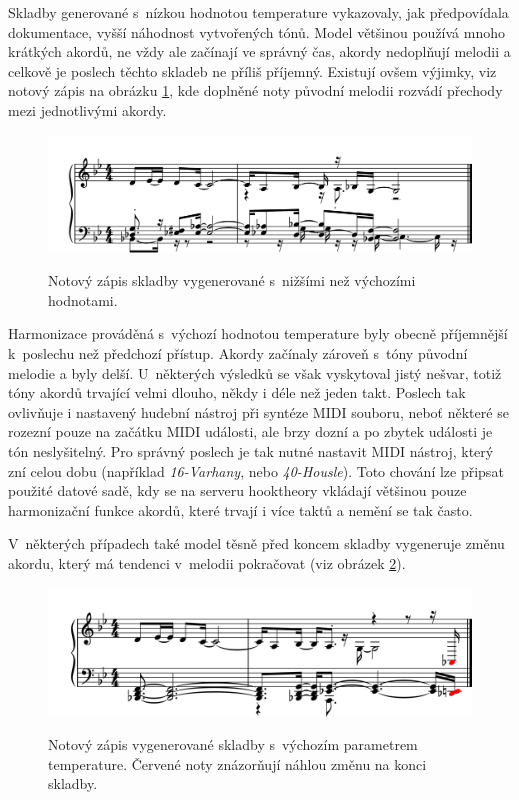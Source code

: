Skladby generované s~nízkou hodnotou temperature vykazovaly,
jak předpovídala dokumentace, vyšší náhodnost vytvořených tónů.
Model většinou používá mnoho krátkých akordů, 
ne vždy ale začínají ve správný čas, akordy nedoplňují melodii 
a celkově je poslech těchto skladeb ne příliš příjemný.
Existují ovšem výjimky, viz notový zápis na obrázku 
\ref{obrazekKratkaSkladbaHarmonizovanaLowNoty},
kde doplněné noty původní melodii rozvádí přechody mezi jednotlivými akordy.

\begin{figure}[h]\centering
    \centering
    \includegraphics[width=0.8\linewidth]{obrazky/KratkaSkladbaHarmonizovanaLowNoty.png}\\[1pt]  
    \caption{Notový zápis skladby vygenerované s~nižšími než výchozími hodnotami.}    
    \label{obrazekKratkaSkladbaHarmonizovanaLowNoty}
\end{figure}
\par

Harmonizace prováděná s~výchozí hodnotou temperature 
byly obecně příjemnější k~poslechu než předchozí přístup.
Akordy začínaly zároveň s~tóny původní melodie a byly delší.
U~některých výsledků se však vyskytoval jistý nešvar, 
totiž tóny akordů trvající velmi dlouho, někdy i déle než jeden takt.
Poslech tak ovlivňuje i nastavený hudební nástroj při syntéze MIDI souboru,
neboť některé se rozezní pouze na začátku MIDI události, ale brzy dozní
a po zbytek události je tón neslyšitelný.
Pro správný poslech je tak nutné nastavit MIDI nástroj, který zní celou dobu
(například \emph{16-Varhany}, nebo \emph{40-Housle}).
Toto chování lze připsat použité datové sadě,
kdy se na serveru hooktheory vkládají většinou pouze harmonizační funkce akordů,
které trvají i více taktů a nemění se tak často.
\par
V~některých případech také model těsně před koncem skladby vygeneruje změnu akordu,
který má tendenci v~melodii pokračovat (viz obrázek \ref{obrazekKratkaSkladbaHarmonizovanaDefNoty}).

\begin{figure}[h]\centering
    \centering
    \includegraphics[width=0.8\linewidth]{obrazky/KratkaSkladbaHarmonizovanaDefNoty-1.png}\\[1pt]  
    \caption{Notový zápis vygenerované skladby s~výchozím parametrem temperature. 
    Červené noty znázorňují náhlou změnu na konci skladby.}    
    \label{obrazekKratkaSkladbaHarmonizovanaDefNoty}
\end{figure}
\par

